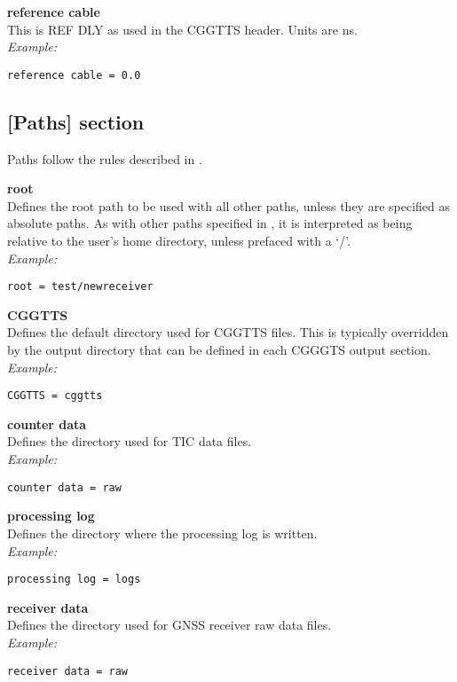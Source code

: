 {\bfseries reference cable}\\
This is REF DLY as used in the CGGTTS header. Units are ns.\\
\textit{Example:}
\begin{lstlisting}
reference cable = 0.0
\end{lstlisting}

\subsection{[Paths] section} 

\hypertarget{h:paths}{}

Paths follow the rules described in .

{\bfseries root}\\ \hypertarget{h:rootpath}{}
Defines the root path to be used with all other paths, unless they are specified as absolute paths.
As with other paths specified in , it is interpreted as being relative to the user's
home directory, unless prefaced with a `/'.\\
\textit{Example:}
\begin{lstlisting}
root = test/newreceiver
\end{lstlisting}

{\bfseries CGGTTS}\\
Defines the default directory used for CGGTTS files.
This is typically overridden by the output directory that can be  defined in each CGGGTS output section.\\
\textit{Example:}
\begin{lstlisting}
CGGTTS = cggtts
\end{lstlisting}

{\bfseries counter data}\\
Defines the directory used for TIC data files.\\
\textit{Example:}
\begin{lstlisting}
counter data = raw
\end{lstlisting}

{\bfseries processing log}\\
Defines the directory where the  processing log is written.\\
\textit{Example:}
\begin{lstlisting}
processing log = logs
\end{lstlisting}

{\bfseries receiver data}\\
Defines the directory used for GNSS receiver raw data files.\\
\textit{Example:}
\begin{lstlisting}
receiver data = raw
\end{lstlisting}


